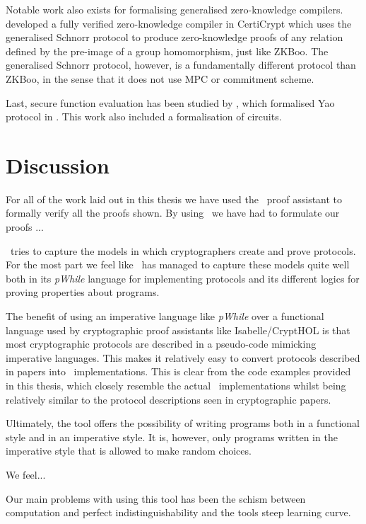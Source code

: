 Notable work also exists for formalising generalised zero-knowledge compilers.
\citet{zkcrypt} developed a fully verified zero-knowledge compiler in CertiCrypt
which uses the generalised Schnorr protocol to produce zero-knowledge proofs of
any relation defined by the pre-image of a group homomorphism, just like ZKBoo.
The generalised Schnorr protocol, however, is a fundamentally different protocol
than ZKBoo, in the sense that it does not use MPC or commitment scheme.

Last, secure function evaluation has been studied by \citet{Yao}, which
formalised Yao protocol in \easycrypt. This work also included a formalisation
of circuits.


\section{Discussion}
\label{sec:discussion}
For all of the work laid out in this thesis we have used the \easycrypt\ proof
assistant to formally verify all the proofs shown. By using \easycrypt\ we have
had to formulate our proofs ...

\easycrypt\ tries to capture the models in which cryptographers create and prove
protocols. For the most part we feel like \easycrypt\ has managed to capture
these models quite well both in its \textit{pWhile} language for implementing
protocols and its different logics for proving properties about programs.

The benefit of using an imperative language like \textit{pWhile} over a functional
language used by cryptographic proof assistants like Isabelle/CryptHOL is that most
cryptographic protocols are described in a pseudo-code mimicking imperative
languages. This makes it relatively easy to convert protocols described in
papers into \easycrypt\ implementations. This is clear from the code examples
provided in this thesis, which closely resemble the actual \easycrypt\
implementations whilst being relatively similar to the protocol descriptions
seen in cryptographic papers.

Ultimately, the tool offers the possibility of writing programs both in a
functional style and in an imperative style. It is, however, only programs
written in the imperative style that is allowed to make random choices.

We feel...

Our main problems with using this tool has been the schism between computation
and perfect indistinguishability and the tools steep learning curve.

